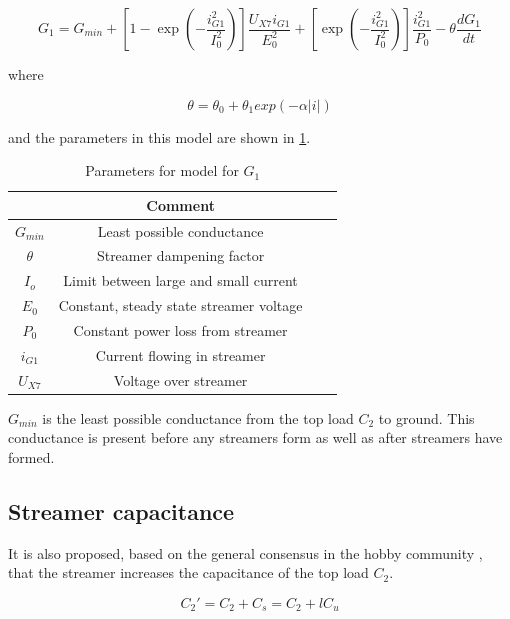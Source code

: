 \begin{equation} \label{eq:g1}
    G_1 = G_{min} + [ 1 - \exp(-\frac{i_{G1}^2}{I_0^2})] \frac{U_{X7} i_{G1}}{E_0^2} + [\exp(-\frac{i_{G1}^2}{I_0^2})] \frac{i_{G1}^2}{P_0} - \theta \frac{d G_1}{dt}
\end{equation}

where

\begin{equation}
    \theta = \theta_0 + \theta_1 exp(-\alpha |i|)
\end{equation}

and the parameters in this model are shown in \cref{tab:g1params}.

\begin{table}[h]
    \centering
    \begin{tabular}{c|c|c|c}
         & Comment &  &\\ \hline
        $G_{min}$ & Least possible conductance &  &\\
        $\theta$  & Streamer dampening factor &  &\\
        $I_o$     & Limit between large and small current &  &\\
        $E_0$     & Constant, steady state streamer voltage &  &\\
        $P_0$     & Constant power loss from streamer &  & \\
        $i_{G1}$  & Current flowing in streamer      &  & \\
        $U_{X7}$     & Voltage over streamer            &  &
    \end{tabular}
    \caption{Parameters for model for $G_1$}
    \label{tab:g1params}
\end{table}

$G_{min}$ is the least possible conductance from the top load $C_2$ to ground. This conductance is present before any streamers form as well as after streamers have formed.


\subsection{Streamer capacitance}
It is also proposed, based on the general consensus in the hobby community \citep{streamercapacitance}, that the streamer increases the capacitance of the top load $C_2$.

\begin{equation}
    C_2' = C_2 + C_s = C_2 + l C_u
\end{equation}

